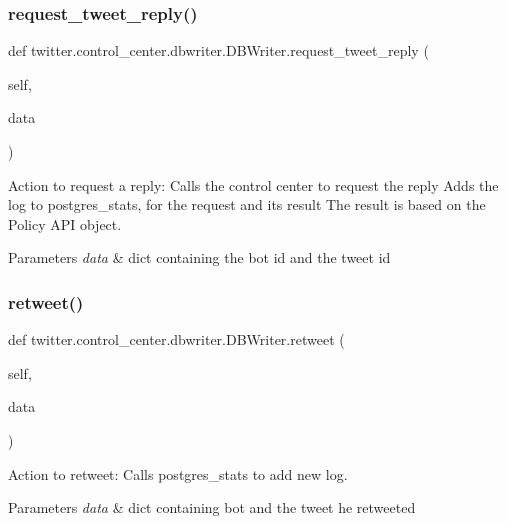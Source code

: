 \subsubsection{\texorpdfstring{request\+\_\+tweet\+\_\+reply()}{request\_tweet\_reply()}}
{\footnotesize\ttfamily def twitter.\+control\+\_\+center.\+dbwriter.\+D\+B\+Writer.\+request\+\_\+tweet\+\_\+reply (\begin{DoxyParamCaption}\item[{}]{self,  }\item[{}]{data }\end{DoxyParamCaption})}



Action to request a reply\+: Calls the control center to request the reply Adds the log to postgres\+\_\+stats, for the request and its result The result is based on the Policy A\+PI object. 


\begin{DoxyParams}{Parameters}
{\em data} & dict containing the bot id and the tweet id \\
\hline
\end{DoxyParams}
\mbox{\label{classtwitter_1_1control__center_1_1dbwriter_1_1DBWriter_a840d1892b618a29a5e44305cb6aa0211}} 
\subsubsection{\texorpdfstring{retweet()}{retweet()}}
{\footnotesize\ttfamily def twitter.\+control\+\_\+center.\+dbwriter.\+D\+B\+Writer.\+retweet (\begin{DoxyParamCaption}\item[{}]{self,  }\item[{}]{data }\end{DoxyParamCaption})}



Action to retweet\+: Calls postgres\+\_\+stats to add new log. 


\begin{DoxyParams}{Parameters}
{\em data} & dict containing bot and the tweet he retweeted \\
\hline
\end{DoxyParams}
\mbox{\label{classtwitter_1_1control__center_1_1dbwriter_1_1DBWriter_a6b55377307e8c59054e0f136942c4a79}} 
